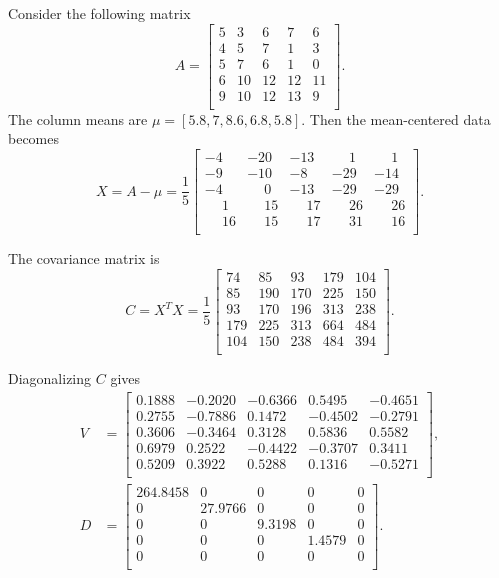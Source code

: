 \def\Amat{\begin{bmatrix}
    5 &  3 &  6 &  7 &  6 \\
    4 &  5 &  7 &  1 &  3 \\
    5 &  7 &  6 &  1 &  0 \\
    6 & 10 & 12 & 12 & 11 \\
    9 & 10 & 12 & 13 &  9 \\
\end{bmatrix}}
Consider the following matrix \[A = \Amat.\]
The column means are \(\mu = [5.8,7,8.6,6.8,5.8]\).
Then the mean-centered data becomes
\def\-{\phantom{-}}
\[X = A - \mu = \frac{1}{5}\begin{bmatrix}
        -4 &   -20 &   -13 &   \-1 &   \-1 \\
        -9 &   -10 &    -8 &   -29 &   -14 \\
        -4 &   \-0 &   -13 &   -29 &   -29 \\
        \-1 &  \-15 &  \-17 &  \-26 &  \-26 \\
    \-16 &  \-15 &  \-17 &  \-31 &  \-16 \\
\end{bmatrix}.\]

The covariance matrix is
\[C = X^TX = \frac{1}{5}\begin{bmatrix}
        74 &  85 &  93 & 179 & 104 \\
        85 & 190 & 170 & 225 & 150 \\
        93 & 170 & 196 & 313 & 238 \\
    179 & 225 & 313 & 664 & 484 \\
    104 & 150 & 238 & 484 & 394 \\
\end{bmatrix}.\]

Diagonalizing \(C\) gives
\begin{align*}
    V &= \begin{bmatrix}
        0.1888 & -0.2020 & -0.6366 &  0.5495 & -0.4651\\
        0.2755 & -0.7886 &  0.1472 & -0.4502 & -0.2791\\
        0.3606 & -0.3464 &  0.3128 &  0.5836 &  0.5582\\
        0.6979 &  0.2522 & -0.4422 & -0.3707 &  0.3411\\
        0.5209 &  0.3922 &  0.5288 &  0.1316 & -0.5271\\
    \end{bmatrix},\\
    D &= \begin{bmatrix}
        264.8458 &       0 &      0 &      0 & 0 \\
                0 & 27.9766 &      0 &      0 & 0 \\
                0 &       0 & 9.3198 &      0 & 0 \\
                0 &       0 &      0 & 1.4579 & 0 \\
                0 &       0 &      0 &      0 & 0 \\
    \end{bmatrix}.
\end{align*}

